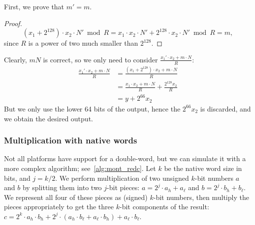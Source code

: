 \documentclass[../fheimpl.tex]{subfiles}
\begin{document}
First, we prove that $m'=m$.
\begin{proof}
    \[(x_1+2^{128})\cdot x_2\cdot N'\bmod R = x_1\cdot x_2\cdot N' + 2^{128}\cdot x_2\cdot N'\bmod R = m,\]
    since $R$ is a power of two much smaller than $2^{128}$.
\end{proof}

Clearly, $mN$ is correct, so we only need to consider $\frac{x_1'\cdot x_2+m\cdot N}{R}$:
\begin{align}
    \frac{x_1'\cdot x_2+m\cdot N}{R} &= \frac{(x_1 +2^{128})\cdot x_2+m\cdot N}{R} \\
    &= \frac{x_1 \cdot x_2+m\cdot N}{R} + \frac{2^{128}x_2}{R} \\
    &= y + 2^{66}x_2
\end{align}
But we only use the lower 64 bits of the output, hence the $2^{66}x_2$ is discarded, and we obtain the desired output.

\subsubsection{Multiplication with native words}
Not all platforms have support for a double-word, but we can simulate it with a more complex algorithm; see~\cref{alg:mont_redc}. Let $k$ be the native word size in bits, and $j = k/2$. We perform multiplication of two unsigned $k$-bit numbers $a$ and $b$ by splitting them into two $j$-bit pieces: $a=2^{j}\cdot a_h + a_\ell$ and $b=2^{j}\cdot b_h+b_\ell$. We represent all four of these pieces as (signed) $k$-bit numbers, then multiply the pieces appropriately to get the three $k$-bit components of the result: $c=2^{k}\cdot a_h\cdot b_h + 2^{j}\cdot(a_h\cdot b_\ell + a_\ell\cdot b_h) + a_\ell\cdot b_\ell$. 
\end{document}
